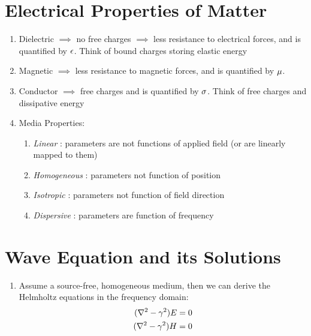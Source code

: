 \documentclass{article}
\begin{document}
\section{Electrical Properties of Matter}
\begin{enumerate}
   \item Dielectric $\implies$ no free charges $\implies$ less resistance to
      electrical forces, and is quantified by $\epsilon$. Think of bound charges
      storing elastic energy
   \item Magnetic $\implies$ less resistance to magnetic forces, and is quantified by
      $\mu$.
   \item Conductor $\implies$ free charges and is quantified by $\sigma$. Think of
      free charges and dissipative energy
   \item Media Properties:
   \begin{enumerate}
      \item \emph{Linear} : parameters are not functions of applied field (or are
         linearly mapped to them)
      \item \emph{Homogeneous} : parameters not function of position
      \item \emph{Isotropic} : parameters not function of field direction 
      \item \emph{Dispersive} : parameters are function of frequency
   \end{enumerate}
\end{enumerate}
\section{Wave Equation and its Solutions}
\begin{enumerate}
   \item Assume a source-free, homogeneous medium, then we can derive the Helmholtz
   equations in the frequency domain:
   \begin{subequations}
      \begin{align}
         ( \nabla^2 - \gamma^2 ) E &= 0 \label{eq:electricHelmholtz} \\
         ( \nabla^2 - \gamma^2 ) H &= 0 \label{eq:magneticHelmholtz}
      \end{align}
   \end{subequations}
\end{enumerate}
\end{document}
